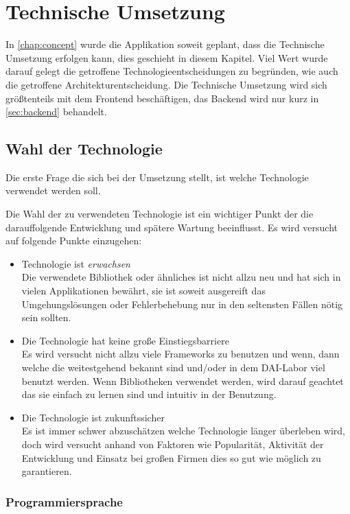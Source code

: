 \documentclass[12pt,twoside]{book}
\begin{document}
\chapter{Technische Umsetzung}\label{chap:tech}

In \ref{chap:concept} wurde die Applikation soweit geplant, dass die Technische Umsetzung erfolgen kann, dies geschieht in diesem Kapitel. Viel Wert wurde darauf gelegt die getroffene Technologieentscheidungen zu begründen, wie auch die getroffene Architekturentscheidung.
Die Technische Umsetzung wird sich größtenteils mit dem Frontend beschäftigen, das Backend wird nur kurz in \ref{sec:backend} behandelt.


\section{Wahl der Technologie}

Die erste Frage die sich bei der Umsetzung stellt, ist welche Technologie verwendet werden soll.

Die Wahl der zu verwendeten Technologie ist ein wichtiger Punkt der die darauffolgende Entwicklung und spätere Wartung beeinflusst. Es wird versucht auf folgende Punkte einzugehen:

\begin{itemize}
  \item Technologie ist \textit{erwachsen} \\
  Die verwendete Bibliothek oder ähnliches ist nicht allzu neu und hat sich in vielen Applikationen bewährt, sie ist soweit ausgereift das Umgehungslösungen oder Fehlerbehebung nur in den seltensten Fällen nötig sein sollten.
  \item Die Technologie hat keine große Einstiegsbarriere \\
  Es wird versucht nicht allzu viele Frameworks zu benutzen und wenn, dann welche die weitestgehend bekannt sind und/oder in dem DAI-Labor viel benutzt werden. Wenn Bibliotheken verwendet werden, wird darauf geachtet das sie einfach zu lernen sind und intuitiv in der Benutzung.
  \item Die Technologie ist zukunftssicher \\
  Es ist immer schwer abzuschätzen welche Technologie länger überleben wird, doch wird versucht anhand von Faktoren wie Popularität, Aktivität der Entwicklung und Einsatz bei großen Firmen dies so gut wie möglich zu garantieren.
\end{itemize}

\subsection{Programmiersprache}
\end{document}
